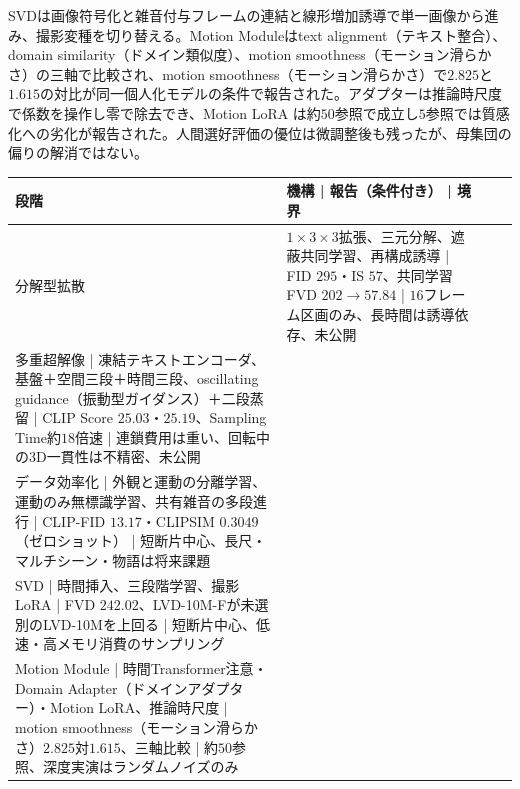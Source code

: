 \documentclass[lualatex,a4paper,10pt]{jlreq}
\begin{document}
\begin{center}
\small
SVDは画像符号化と雑音付与フレームの連結と線形増加誘導で単一画像から進み、撮影変種を切り替える\autocite{btd075}。Motion Moduleはtext alignment（テキスト整合）、domain similarity（ドメイン類似度）、motion smoothness（モーション滑らかさ）の三軸で比較され、motion smoothness（モーション滑らかさ）で$2.825$と$1.615$の対比が同一個人化モデルの条件で報告された\autocite{btd074}。アダプターは推論時尺度で係数を操作し零で除去でき、Motion LoRA は約$50$参照で成立し$5$参照では質感化への劣化が報告された\autocite{btd074}。人間選好評価の優位は微調整後も残ったが、母集団の偏りの解消ではない\autocite{btd075}。

\begin{tabularx}{\textwidth}{@{}p{}p{}p{}X@{}}
\toprule
段階 & 機構 | 報告（条件付き） | 境界 \\
\midrule
分解型拡散\autocite{btd070} & $1 \times 3 \times 3$拡張、三元分解、遮蔽共同学習、再構成誘導 | FID $295$・IS $57$、共同学習FVD $202\to57.84$ | $16$フレーム区画のみ、長時間は誘導依存、未公開 \\
多重超解像\autocite{btd071} | 凍結テキストエンコーダ、基盤＋空間三段＋時間三段、oscillating guidance（振動型ガイダンス）＋二段蒸留 | CLIP Score $25.03$・$25.19$、Sampling Time約$18$倍速 | 連鎖費用は重い、回転中の3D一貫性は不精密、未公開 \\
データ効率化\autocite{btd073} | 外観と運動の分離学習、運動のみ無標識学習、共有雑音の多段進行 | CLIP-FID $13.17$・CLIPSIM $0.3049$（ゼロショット） | 短断片中心、長尺・マルチシーン・物語は将来課題 \\
SVD\autocite{btd075} | 時間挿入、三段階学習、撮影 LoRA | FVD $242.02$、LVD-10M-Fが未選別のLVD-10Mを上回る | 短断片中心、低速・高メモリ消費のサンプリング \\
Motion Module\autocite{btd074} | 時間Transformer注意・Domain Adapter（ドメインアダプター）・Motion LoRA、推論時尺度 | motion smoothness（モーション滑らかさ）$2.825$対$1.615$、三軸比較 | 約$50$参照、深度実演はランダムノイズのみ \\
\bottomrule
\end{tabularx}
\end{center}
\end{document}
